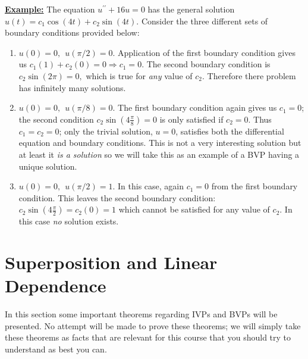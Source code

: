 \vspace{0.5cm}
\noindent \underline{\textbf{Example:}} The equation $u^{\prime \prime}+16u = 0$ has the general solution $u(t) = c_1 \cos{(4t)}+c_2 \sin{(4t)}$.  Consider the three different sets of boundary conditions provided below:
\begin{enumerate}[label=\alph*)]
\item $u(0)=0, \ \ u(\pi/2)=0$.
Application of the first boundary condition gives us $c_1(1)+c_2(0)=0 \Rightarrow c_1 = 0$.  The second boundary condition is $c_2\sin{(2 \pi)} = 0,$ which is true for \emph{any} value of $c_2$.  Therefore there problem has infinitely many solutions.
\item $u(0)=0, \ \ u(\pi/8)=0$.
The first boundary condition again gives us $c_1=0$; the second condition $c_2\sin{(4 \frac{\pi}{8})}=0$ is only satisfied if $c_2=0$.  Thus $c_1 = c_2 = 0$; only the trivial solution, $u=0$, satisfies both the differential equation and boundary conditions.  This is not a very interesting solution but at least it \emph{is a solution} so we will take this as an example of a BVP having a unique solution.
\item $u(0)=0, \ \ u(\pi/2)=1$.
In this case, again $c_1=0$ from the first boundary condition.  This leaves the second boundary condition: $c_2 \sin{\left(4 \frac{\pi}{2}\right)} = c_2(0) = 1$ which cannot be satisfied for any value of $c_2$.  In this case \emph{no} solution exists.

\end{enumerate}

\section{Superposition and Linear Dependence}  
In this section some important theorems regarding IVPs and BVPs will be presented.  No attempt will be made to prove these theorems; we will simply take these theorems as facts that are relevant for this course that you should try to understand as best you can.

